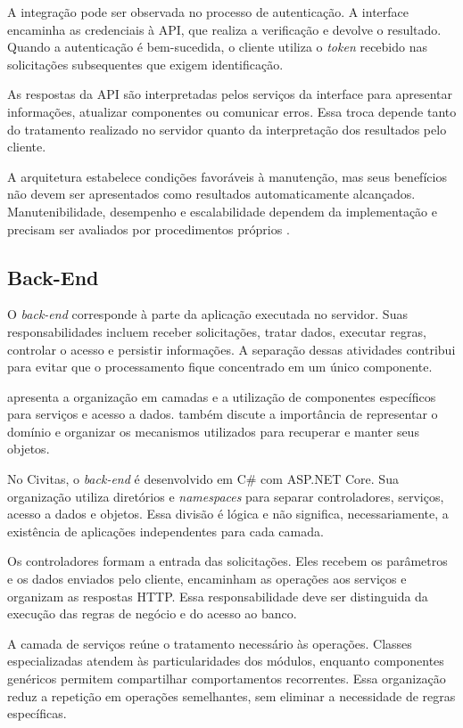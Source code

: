 A integração pode ser observada no processo de autenticação. A interface encaminha as credenciais à API, que realiza a verificação e devolve o resultado. Quando a autenticação é bem-sucedida, o cliente utiliza o \textit{token} recebido nas solicitações subsequentes que exigem identificação.

As respostas da API são interpretadas pelos serviços da interface para apresentar informações, atualizar componentes ou comunicar erros. Essa troca depende tanto do tratamento realizado no servidor quanto da interpretação dos resultados pelo cliente.

A arquitetura estabelece condições favoráveis à manutenção, mas seus benefícios não devem ser apresentados como resultados automaticamente alcançados. Manutenibilidade, desempenho e escalabilidade dependem da implementação e precisam ser avaliados por procedimentos próprios \parencite{Bass2021SAP}.

\subsection{Back-End}
\label{subsec:cap6-back-end}

O \textit{back-end} corresponde à parte da aplicação executada no servidor. Suas responsabilidades incluem receber solicitações, tratar dados, executar regras, controlar o acesso e persistir informações. A separação dessas atividades contribui para evitar que o processamento fique concentrado em um único componente.

\textcite{Fowler2002PEAA} apresenta a organização em camadas e a utilização de componentes específicos para serviços e acesso a dados. \textcite{Evans2004DDD} também discute a importância de representar o domínio e organizar os mecanismos utilizados para recuperar e manter seus objetos.

No Civitas, o \textit{back-end} é desenvolvido em C\# com ASP.NET Core. Sua organização utiliza diretórios e \textit{namespaces} para separar controladores, serviços, acesso a dados e objetos. Essa divisão é lógica e não significa, necessariamente, a existência de aplicações independentes para cada camada.

Os controladores formam a entrada das solicitações. Eles recebem os parâmetros e os dados enviados pelo cliente, encaminham as operações aos serviços e organizam as respostas HTTP. Essa responsabilidade deve ser distinguida da execução das regras de negócio e do acesso ao banco.

A camada de serviços reúne o tratamento necessário às operações. Classes especializadas atendem às particularidades dos módulos, enquanto componentes genéricos permitem compartilhar comportamentos recorrentes. Essa organização reduz a repetição em operações semelhantes, sem eliminar a necessidade de regras específicas.

